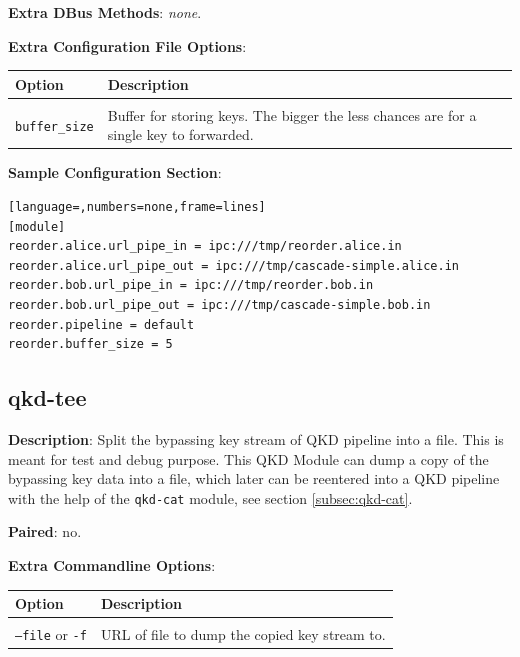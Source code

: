 \bigskip

\noindent \textbf{Extra DBus Methods}: \emph{none}.

\bigskip

\noindent \textbf{Extra Configuration File Options}:

\medskip

\begin{tabular}{lp{9cm}}

Option                      & Description \\
\hline
\\
\texttt{buffer\_size}       & Buffer for storing keys. The bigger the less chances are for a single key to forwarded. \\ [0.5em]

\end{tabular}

\bigskip

\noindent \textbf{Sample Configuration Section}: 

\medskip

\begin{lstlisting}[language=,numbers=none,frame=lines]
[module]
reorder.alice.url_pipe_in = ipc:///tmp/reorder.alice.in
reorder.alice.url_pipe_out = ipc:///tmp/cascade-simple.alice.in
reorder.bob.url_pipe_in = ipc:///tmp/reorder.bob.in
reorder.bob.url_pipe_out = ipc:///tmp/cascade-simple.bob.in
reorder.pipeline = default
reorder.buffer_size = 5
\end{lstlisting}

\clearpage


\subsection{qkd-tee}
\label{subsec:qkd-tee}

\textbf{Description}: Split the bypassing key stream of QKD pipeline into a file. This is meant for test and debug purpose. This QKD Module can dump a copy of the bypassing key data into a file, which later can be reentered into a QKD pipeline with the help of the \texttt{qkd-cat} module, see section \ref{subsec:qkd-cat}.

\bigskip

\noindent \textbf{Paired}: no.

\bigskip

\noindent \textbf{Extra Commandline Options}:

\medskip

\begin{tabular}{lp{10cm}}

Option                              & Description \\
\hline
\\
\texttt{--file} or \texttt{-f}      & URL of file to dump the copied key stream to. \\ [0.5em]

\end{tabular}

